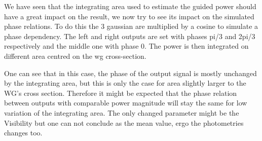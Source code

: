 We have seen that the integrating area used to estimate the guided
power should have a great
impact on the result, we now try to see its impact on the simulated
phase relations. To do this the 3 gaussian are multiplied by a cosine
to simulate a phase dependency. The left and right outputs are set
with phases pi/3 and 2pi/3 respectively and the middle one with phase
0. The power is then integrated on different area centred on the \gls{wg} cross-section.

One can see that in this case, the phase of the output signal is
mostly unchanged by the integrating area, but this is only the case
for area slightly larger to the WG's cross section. Therefore it
might be expected that the phase relation between outputs with
comparable power magnitude will stay the same for low variation of the
integrating area. The only changed parameter might be the Visibility
but one can not conclude as the mean value, ergo the photometries changes too.

